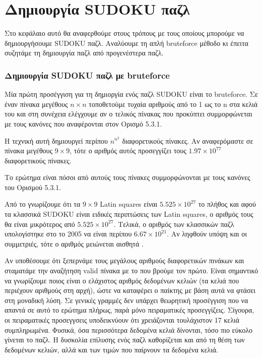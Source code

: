 \documentclass[12pt]{book}
\theoremstyle{definition}
\begin{document}
\chapter{Δημιουργία SUDOKU παζλ}

Στο κεφάλαιο αυτό θα αναφερθούμε στους τρόπους με τους οποίους μπορούμε να δημιουργήσουμε SUDOKU παζλ. Αναλύουμε τη απλή bruteforce μέθοδο κι έπειτα συζητάμε τη δημιουργία παζλ από προγενέστερα παζλ.

\subsection{Δημιουργία SUDOKU παζλ με bruteforce}

Μία πρώτη προσέγγιση για τη δημιοργία ενός παζλ SUDOKU είναι το bruteforce. Σε έναν πίνακα μεγέθους \(n \times n\) τοποθετούμε τυχαία αριθμούς από το 1 ως το n στα κελιά του και στη συνέχεια ελέγχουμε αν ο τελικός πίνακας που προκύπτει συμμορφώνεται με τους κανόνες που αναφέρονται στον Ορισμό 5.3.1. \par

Η τεχνική αυτή δημιουργεί περίπου \(n^{n^2}\) διαφορετικούς πίνακες. Αν αναφερόμαστε σε πίνακα μεγέθους \(9 \times 9\), τότε ο αριθμός αυτός προσεγγίζει τους \(1.97\times10^{77}\) διαφορετικούς πίνακες. \par 

Το ερώτημα είναι πόσοι από αυτούς τους πίνακες συμμορφώνονται με τους κανόνες του Ορισμού 5.3.1. \par

Από το \cite{6} γνωρίζουμε ότι τα \(9 \times 9\) Latin squares είναι \(5.525\times10^27\) το πλήθος και αφού τα κλασσικά SUDOKU είναι ειδικές περιπτώσεις των Latin squares, ο αριθμός τους θα είναι μικρότερος από \(5.525\times10^27\). Τελικά, ο αριθμός των κλασσικών παζλ υπολογίστηκε στο \cite{7} το 2005 να είναι περίπου \(6.67\times10^21\). Αν ληφθούν υπόψη και οι συμμετριές, τότε ο αριθμός μειώνεται αισθητά \cite{8}.

Αν υποθέσουμε ότι ξεπερνάμε τους μεγάλους αριθμούς διαφορετικών πινάκων και σταματάμε την αναζήτηση valid πίνακα με το που βρούμε τον πρώτο. Είναι σημαντικό να γνωρίζουμε ποιος είναι ο ελάχιστος αριθμός δεδομένων κελιών (τα κελιά που περιέχουν αριθμούς στη αρχή), ώστε να καταφέρει ο παίκτης με βάση αυτά να φτάσει στη μοναδική λύση. Σε γενικές γραμμές δεν υπάρχει θεωρητική προσέγγιση που να απαντά σε αυτό το ερώτημα πλήρως, παρά μόνο πειραματικές προσεγγίζεις. Σίγουρα, οι πειραματικές προσεγγσεις υποδεικνύουν ότι χρειάζονται τουλάχιστον 17 κελιά συμπληρωμένα. Φυσικά, όσα περισσότερα δεδομένα κελιά δίνονται, τόσο πιο εύκολο γίνεται το παζλ. Η δυσκολία επίλυσης ενός παζλ καθορίζεται και από τη θέση των δεδομένων κελιών, αλλά και των τιμών που παίρνουν τα δεδομένα κελιά.
\end{document}
